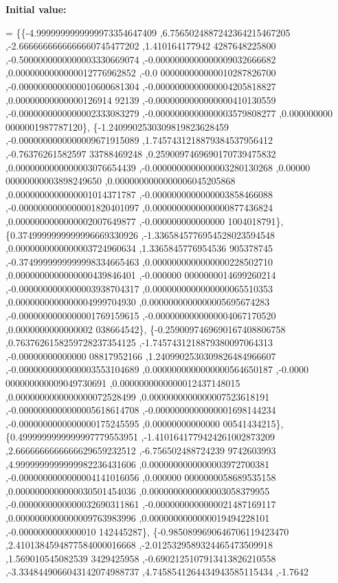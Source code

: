 {\bfseries Initial value\+:}
\begin{DoxyCode}
= \{\{-4.9999999999999973354647409 ,6.7565024887242364215467205 ,-2.6666666666666660745477202 ,1.410164177942
      4287648225800 ,-0.5000000000000003330669074 ,-0.0000000000000009032666682 ,0.0000000000000012776962852 ,-0.0
      000000000000010287826700 ,-0.0000000000000010600681304 ,-0.0000000000000004205818827 ,0.00000000000000126914
      92139 ,-0.0000000000000000410130559 ,-0.0000000000000002333083279 ,-0.0000000000000003579808277 ,0.000000000
      0000001987787120\},
\{-1.2409902530309819823628459 ,-0.0000000000000009671915089 ,1.7457431218879384537956412 ,-0.76376261582597
      33788469248 ,0.2590097469690170739475832 ,0.0000000000000003076654439 ,-0.0000000000000003280130268 ,0.00000
      00000000003898249650 ,0.0000000000000006045205868 ,0.0000000000000001014371787 ,-0.0000000000000003858466088
       ,-0.0000000000000001820401097 ,0.0000000000000000877436824 ,0.0000000000000002007649877 ,-0.000000000000000
      1004018791\},
\{0.3749999999999996669330926 ,-1.3365845776954528023594548 ,0.0000000000000003724960634 ,1.3365845776954536
      905378745 ,-0.3749999999999998334665463 ,0.0000000000000000228502710 ,0.0000000000000000439846401 ,-0.000000
      0000000014699260214 ,-0.0000000000000003938704317 ,0.0000000000000000065510353 ,0.0000000000000004999704930 
      ,0.0000000000000005695674283 ,-0.0000000000000001769159615 ,-0.0000000000000004067170520 ,0.0000000000000002
      038664542\},
\{-0.2590097469690167408806758 ,0.7637626158259728237354125 ,-1.7457431218879380097064313 ,-0.00000000000000
      08817952166 ,1.2409902530309826484966607 ,-0.0000000000000003553104689 ,0.0000000000000000564650187 ,-0.0000
      000000000009049730691 ,0.0000000000000012437148015 ,0.0000000000000000072528499 ,0.0000000000000007523618191
       ,-0.0000000000000005618614708 ,-0.0000000000000001698144234 ,-0.0000000000000000175245595 ,0.00000000000000
      00541434215\},
\{0.4999999999999997779553951 ,-1.4101641779424261002873209 ,2.6666666666666629659232512 ,-6.756502488724239
      9742603993 ,4.9999999999999982236431606 ,0.0000000000000003972700381 ,-0.0000000000000004141016056 ,0.000000
      0000000058689535158 ,0.0000000000000030501454036 ,0.0000000000000003058379955 ,-0.0000000000000032690311861 
      ,-0.0000000000000021487169117 ,0.0000000000000009763983996 ,0.0000000000000019494228101 ,-0.0000000000000010
      142445287\},
\{-0.9850899690646706119423470 ,2.4101384594877584000016668 ,-2.0125329589324465473509918 ,1.569010545082539
      3429425958 ,-0.6902125107913413826210558 ,-3.3348449066043142074988737 ,4.7458541264434943585115434 ,-1.7642

\end{DoxyCode}
